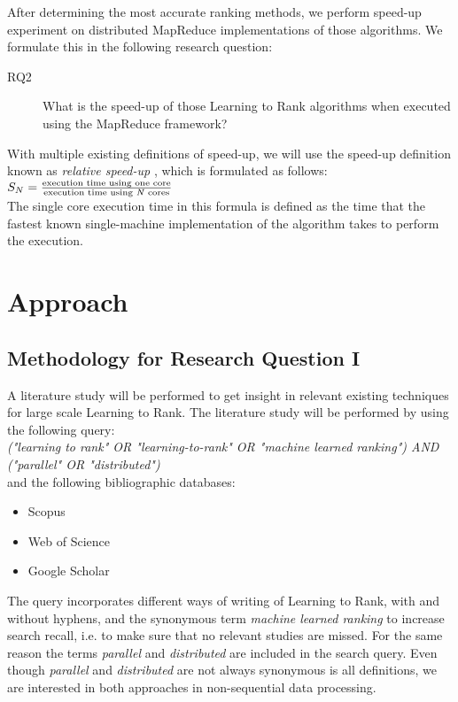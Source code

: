 After determining the most accurate ranking methods, we perform speed-up experiment on distributed MapReduce implementations of those algorithms. We formulate this in the following research question: \\

\begin{description}
\item[RQ2] What is the speed-up of those Learning to Rank algorithms when executed using the MapReduce framework?
\end{description}
\bigskip
With multiple existing definitions of speed-up, we will use the speed-up definition known as \emph{relative speed-up} \cite{Sun1991}, which is formulated as follows:\\

$S_N = \frac{\text{execution time using one core}}{\text{execution time using \emph{N} cores}}$\\

The single core execution time in this formula is defined as the time that the fastest known single-machine implementation of the algorithm takes to perform the execution.

\section{Approach}
\subsection{Methodology for Research Question I}
A literature study will be performed to get insight in relevant existing techniques for large scale Learning to Rank. The literature study will be performed by using the following query:\\

\emph{("learning to rank" \emph{OR} "learning-to-rank" \emph{OR} "machine learned ranking") \emph{AND} ("parallel" \emph{OR} "distributed")}\\

and the following bibliographic databases:
\begin{itemize}
\item Scopus
\item Web of Science
\item Google Scholar
\end{itemize}

The query incorporates different ways of writing of Learning to Rank, with and without hyphens, and the synonymous term \emph{machine learned ranking} to increase search recall, i.e. to make sure that no relevant studies are missed. For the same reason the terms \emph{parallel} and \emph{distributed} are included in the search query. Even though \emph{parallel} and \emph{distributed} are not always synonymous is all definitions, we are interested in both approaches in non-sequential data processing.\\

